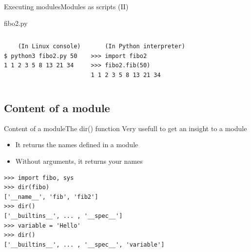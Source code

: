 \documentclass[10pt,compress]{beamer} %
\begin{document}
\begin{frame}{Executing modules}{Modules as scripts (II)}
    \small
	\vspace{-0.3cm}
	\begin{exampleblock}{fibo2.py}
	\vspace{-0.2cm}
	
	\vspace{-0.2cm}
	\end{exampleblock}

	\vspace{-0.5cm}
	\begin{columns}
	\begin{exampleblock}{}
	\vspace{-0.2cm}
	\begin{verbatim}
    (In Linux console)
$ python3 fibo2.py 50
1 1 2 3 5 8 13 21 34
\end{verbatim}
	\vspace{-0.2cm}
	\end{exampleblock}

	\begin{exampleblock}{}
	\vspace{-0.2cm}
	\begin{verbatim}
    (In Python interpreter)
>>> import fibo2
>>> fibo2.fib(50)
1 1 2 3 5 8 13 21 34
\end{verbatim}
	\vspace{-0.2cm}
	\end{exampleblock}

    \end{columns}
\end{frame}

\subsection{Content of a module}

\begin{frame}[fragile]{Content of a module}{The dir() function}
	Very usefull to get an insight to a module
	\begin{itemize}
		\item It returns the names defined in a module
		\item Without arguments, it returns your names
	\end{itemize}
	\begin{exampleblock}{}
	\begin{verbatim}
>>> import fibo, sys
>>> dir(fibo)
['__name__', 'fib', 'fib2']
>>> dir()
['__builtins__', ... , '__spec__']
>>> variable = 'Hello'
>>> dir()
['__builtins__', ... , '__spec__', 'variable']
\end{verbatim}
	\vspace{-0.2cm}
	\end{exampleblock}
\end{frame}
\end{document}
